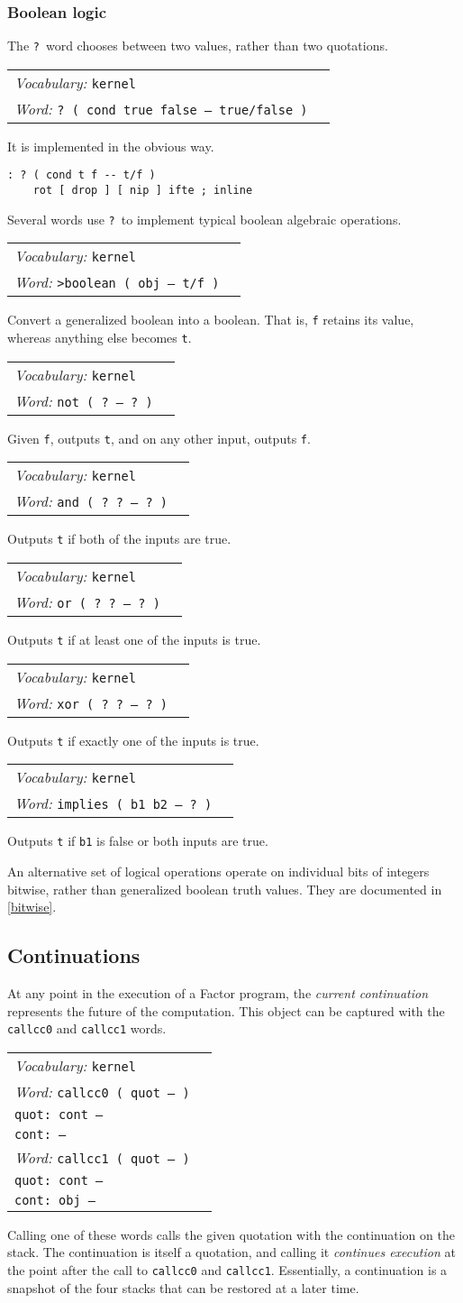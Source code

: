 \documentclass{book}
\newcommand{\vocabulary}[1]{\emph{Vocabulary:} \texttt{#1}&\\}
\newcommand{\ordinaryword}[2]{\index{\texttt{#1}}\emph{Word:} \texttt{#2}&\\}
\newcommand{\wordtable}[1]{

\begin{tabularx}{12cm}[t]{lX}
\hline
#1
\hline
\end{tabularx}

}
\begin{document}
\subsubsection{Boolean logic}

The \texttt{?}~word chooses between two values, rather than two quotations.
\wordtable{
\vocabulary{kernel}
\ordinaryword{?}{?~( cond true false -- true/false )}
}
It is implemented in the obvious way.
\begin{verbatim}
: ? ( cond t f -- t/f )
    rot [ drop ] [ nip ] ifte ; inline
\end{verbatim}
Several words use \texttt{?}~to implement typical boolean algebraic operations.
\wordtable{
\vocabulary{kernel}
\ordinaryword{>boolean}{>boolean ( obj -- t/f )}
}
Convert a generalized boolean into a boolean. That is, \texttt{f} retains its value, whereas anything else becomes \texttt{t}.
\wordtable{
\vocabulary{kernel}
\ordinaryword{not}{not ( ?~-- ?~)}
}
Given \texttt{f}, outputs \texttt{t}, and on any other input, outputs \texttt{f}.
\wordtable{
\vocabulary{kernel}
\ordinaryword{and}{and ( ?~?~-- ?~)}
}
Outputs \texttt{t} if both of the inputs are true.
\wordtable{
\vocabulary{kernel}
\ordinaryword{or}{or ( ?~?~-- ?~)}
}
Outputs \texttt{t} if at least one of the inputs is true.
\wordtable{
\vocabulary{kernel}
\ordinaryword{xor}{xor ( ?~?~-- ?~)}
}
Outputs \texttt{t} if exactly one of the inputs is true.
\wordtable{
\vocabulary{kernel}
\ordinaryword{implies}{implies ( b1~b2~-- ?~)}
}
Outputs \texttt{t} if \texttt{b1} is false or both inputs are true.

An alternative set of logical operations operate on individual bits of integers bitwise, rather than generalized boolean truth values. They are documented in \ref{bitwise}.

\subsection{Continuations}

\newcommand{\contglos}{
}
\contglos
At any point in the execution of a Factor program, the \emph{current continuation} represents the future of the computation. This object can be captured with the \texttt{callcc0} and \texttt{callcc1} words.
\wordtable{
\vocabulary{kernel}
\ordinaryword{callcc0}{callcc0 ( quot -- )}
\texttt{quot:~cont --}\\
\texttt{cont:~--}\\
\ordinaryword{callcc1}{callcc1 ( quot -- )}
\texttt{quot:~cont --}\\
\texttt{cont:~obj --}\\
}
Calling one of these words calls the given quotation with the continuation on the stack. The continuation is itself a quotation, and calling it \emph{continues execution} at the point after the call to \texttt{callcc0} and \texttt{callcc1}. Essentially, a continuation is a snapshot of the four stacks that can be restored at a later time.
\end{document}
